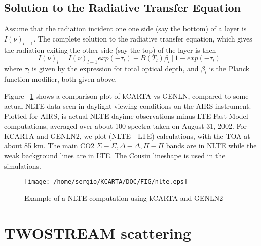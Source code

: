 \documentclass[11pt]{article}
\begin{document}
\subsection{Solution to the Radiative Transfer Equation}
Assume that the radiation incident one one side (say the bottom) of a layer is
$I(\nu)_{l-1}$. The complete solution to the radiative transfer equation, which
gives the radiation exiting the other side (say the top) of the layer is then
\cite{edw:93,edw:98,lop:01,kopra}
\[
I(\nu)_{l} = I(\nu)_{l-1}exp(-{\tau_{l}}) 
             + B(T_{l}) \beta_{l} [1 - exp(-{\tau_{l}})]
\]
where $\tau_{l}$ is given by the expression for total optical depth, and 
$\beta_{l}$ is the Planck function modifier, both given above.

Figure ~\ref{fig:nlte} shows a comparison plot of kCARTA vs GENLN, compared 
to some actual NLTE data seen in daylight viewing conditions on the AIRS 
instrument. Plotted for AIRS, is actual NLTE dayime observations minus LTE 
Fast Model computations, averaged over about 100 spectra taken on 
August 31, 2002. For KCARTA and GENLN2, we plot (NLTE - LTE) 
calculations, with the TOA at about 85 km. The main CO2 $\Sigma-\Sigma, 
\Delta-\Delta, \Pi-\Pi$ bands are in NLTE while the weak background lines are 
in LTE. The Cousin lineshape is used in the simulations.

\begin{figure}
\texttt{[image: /home/sergio/KCARTA/DOC/FIG/nlte.eps]}
  \caption{Example of a NLTE computation using kCARTA and GENLN2}
  \label{fig:nlte} 
\end{figure} 

\section{TWOSTREAM scattering}
\end{document}
